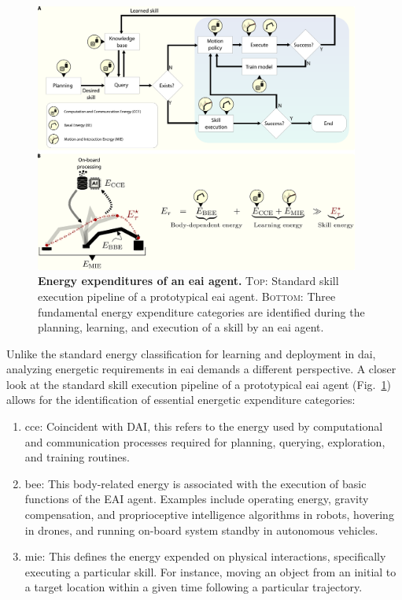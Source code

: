 \documentclass[12pt]{article}
\begin{document}
\begin{figure}[t!]
	\centering
	\includegraphics[width=0.95\textwidth]{eai_energy_categories.png}
	\caption[] {\label{fig:embodied_ai_pipeline} \textbf{Energy expenditures of an \ac{eai} agent.} {\textsc{Top}: Standard skill execution pipeline of a prototypical \ac{eai} agent. \textsc{Bottom}: Three fundamental energy expenditure categories are identified during the planning, learning, and execution of a skill by an \ac{eai} agent.}}
\end{figure}

Unlike the standard energy classification for learning and deployment in \ac{dai}, analyzing energetic requirements in \ac{eai} demands a different perspective. A closer look at the standard skill execution pipeline of a prototypical \ac{eai} agent (Fig.~\ref{fig:embodied_ai_pipeline}) allows for the identification of essential energetic expenditure categories:
\begin{enumerate}
	\item \Acl{cce}: Coincident with DAI, this refers to the energy used by computational and communication processes required for planning, querying, exploration, and training routines.
	\item \Acl{bee}: This body-related energy is associated with the execution of basic functions of the EAI agent. Examples include operating energy, gravity compensation, and proprioceptive intelligence algorithms in robots, hovering in drones, and running on-board system standby in autonomous vehicles.
	\item \Acl{mie}: This defines the energy expended on physical interactions, specifically executing a particular skill. For instance, moving an object from an initial to a target location within a given time following a particular trajectory.
\end{enumerate}
\end{document}
